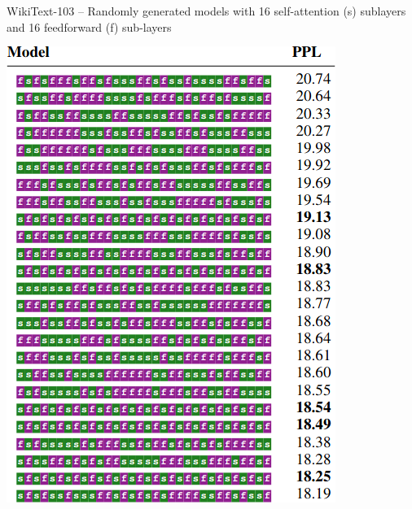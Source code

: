 \documentclass{beamer}
\begin{document}
\begin{frame}
    WikiText-103 -- Randomly generated models with 16 self-attention (s) sublayers and 16 feedforward (f) sub-layers
    \begin{center}
        \includegraphics[scale=0.34]{img/sandwich_transformers_models1.png}
    \end{center}
\end{frame}
\end{document}
